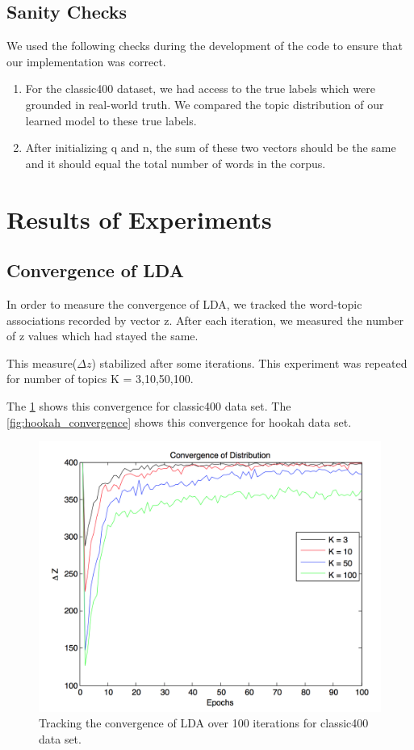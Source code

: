 \documentclass[11pt,a4paper,oneside]{article}
\begin{document}
\subsection{Sanity Checks}
We used the following checks during the development of the code to ensure that our implementation was correct.
\begin{enumerate}
\item For the classic400 dataset, we had access to the true labels which were grounded in real-world truth. We compared the topic distribution of our learned model to these true labels. 
\item After initializing q and n, the sum of these two vectors should be the same and it should equal the total number of words in the corpus.
\end{enumerate}

\section{Results of Experiments}
\label{sec:Results}

\subsection{Convergence of LDA}
In order to measure the convergence of LDA, we tracked the word-topic associations recorded by vector z. After each iteration, we measured the number of z values which had stayed the same. 

This measure($\Delta z$) stabilized after some iterations. This experiment was repeated for number of topics K = 3,10,50,100. 

The \ref{fig:classic400_convergence} shows this convergence for classic400 data set. The \ref{fig:hookah_convergence} shows this convergence for hookah data set.

\begin{figure}[H]
\centering
\includegraphics[width=\columnwidth]{classic400_convergence}
\caption{Tracking the convergence of LDA over 100 iterations for classic400 data set.}
\label{fig:classic400_convergence}
\end{figure}
\end{document}
